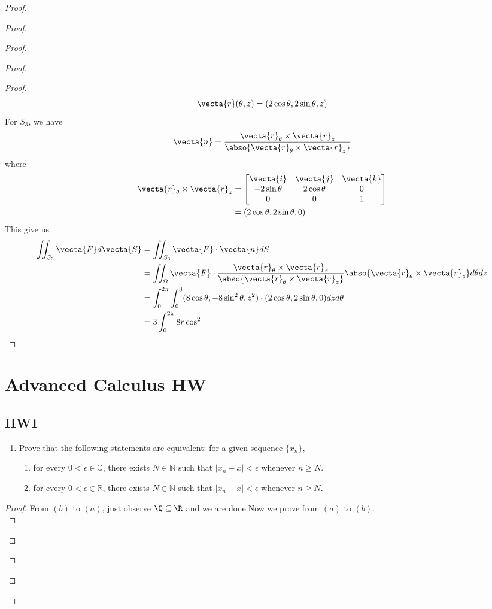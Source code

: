 \documentclass{report}
\begin{document}
\begin{proof}
\begin{proof}
\begin{proof}
\begin{proof}
\begin{proof}
\begin{align*}
\vecta{r}(\theta,z)=(2\cos \theta,2 \sin \theta,z)
\end{align*}
For $S_3$,  we have 
\begin{align*}
\vecta{n}=\frac{\vecta{r}_\theta \times \vecta{r}_z}{\abso{\vecta{r}_\theta \times \vecta{r}_z}}
\end{align*}
where 
\begin{align*}
\vecta{r}_\theta \times \vecta{r}_z &= \begin{bmatrix}
  \vecta{i} & \vecta{j} & \vecta{k}\\
  -2\sin \theta & 2 \cos \theta & 0 \\
  0 & 0 & 1
\end{bmatrix}\\
&=(2\cos \theta, 2\sin \theta, 0)
\end{align*}
This give us 
\begin{align*}
\iint_{S_3} \vecta{F} d\vecta{S}&=\iint_{S_3} \vecta{F}\cdot \vecta{n}dS\\
&=\iint_{\Omega} \vecta{F}\cdot \frac{\vecta{r}_\theta \times \vecta{r}_z}{\abso{\vecta{r}_\theta \times \vecta{r}_z}} \abso{\vecta{r}_\theta \times \vecta{r}_z} d\theta dz\\
&= \int_0^{2\pi}\int_0^3 (8\cos \theta,-8 \sin^2 \theta , z^2) \cdot (2\cos \theta,2 \sin \theta, 0) dzd\theta\\
&=3\int_0^{2\pi} 8r \cos^2 
\end{align*}
\end{proof}





\chapter{Advanced Calculus HW}
\section{HW1}
\begin{question}{}{}
\begin{enumerate}
    \item Prove that the following statements are equivalent: for a given sequence $\{x_n\}$,
    \begin{enumerate}
        \item for every $0 < \epsilon \in \mathbb{Q}$, there exists $N \in \mathbb{N}$ such that $|x_n - x| < \epsilon$ whenever $n \geq N$.
        \item for every $0 < \epsilon \in \mathbb{R}$, there exists $N \in \mathbb{N}$ such that $|x_n - x| < \epsilon$ whenever $n \geq N$.
    \end{enumerate}
\end{enumerate}
\end{question}
\begin{proof}
From $(b)$ to $(a)$, just observe  $\Q \subseteq \R$ and we are done.Now we prove from $(a)$ to $(b)$.\\


\end{proof}
\end{proof}
\end{proof}
\end{proof}
\end{proof}
\end{document}
